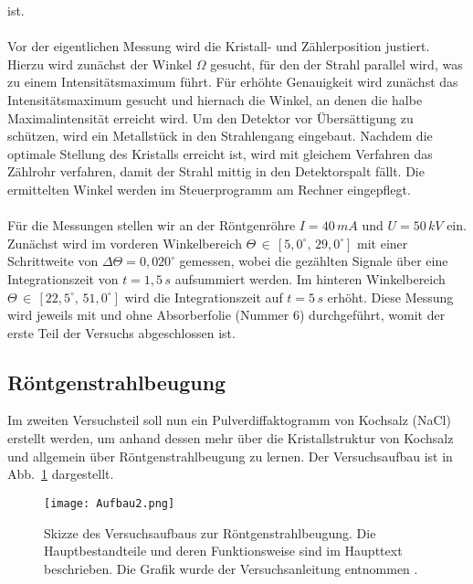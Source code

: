 ist. \\ \\
Vor der eigentlichen Messung wird die Kristall- und Zählerposition justiert. 
Hierzu wird zunächst der Winkel $\Omega$ gesucht, für den der Strahl parallel
wird, was zu einem Intensitätsmaximum führt. Für erhöhte Genauigkeit wird
zunächst das Intensitätsmaximum gesucht und hiernach die Winkel, an denen die halbe 
Maximalintensität erreicht wird. Um den Detektor vor Übersättigung zu schützen, 
wird ein Metallstück in den Strahlengang eingebaut. Nachdem die optimale Stellung 
des Kristalls erreicht ist, wird mit gleichem Verfahren das Zählrohr verfahren, 
damit der Strahl mittig in den Detektorspalt fällt. Die ermittelten Winkel werden
im Steuerprogramm am Rechner eingepflegt. \\ \\
Für die Messungen stellen wir an der Röntgenröhre $I = 40\,\si{mA}$ und 
$U = 50\,\si{kV}$ ein. Zunächst wird im vorderen Winkelbereich 
$\Theta\,\in\,[5,0^{\circ},\,29,0^{\circ}]$ mit einer Schrittweite von 
$\Delta{\Theta} = 0,020^{\circ}$ gemessen, wobei die gezählten Signale 
über eine Integrationszeit von $t=1,5\,\si{s}$ aufsummiert werden. 
Im hinteren Winkelbereich $\Theta\,\in\,[22,5^{\circ},\,51,0^{\circ}]$
wird die Integrationszeit auf $t=5\,\si{s}$ erhöht. 
Diese Messung wird jeweils mit und ohne Absorberfolie (Nummer 6) durchgeführt, 
womit der erste Teil der Versuchs abgeschlossen ist. \\

\subsection{\label{subsec:vers2}Röntgenstrahlbeugung}
Im zweiten Versuchsteil soll nun ein Pulverdiffaktogramm von Kochsalz (NaCl) erstellt werden, um anhand dessen mehr über die Kristallstruktur von Kochsalz und allgemein über Röntgenstrahlbeugung zu lernen. Der Versuchsaufbau ist in Abb.~\ref{fig:vers2} dargestellt.

\begin{figure}[h!]
    \centering
    \texttt{[image: Aufbau2.png]}
    \caption{Skizze des Versuchsaufbaus zur Röntgenstrahlbeugung. Die Hauptbestandteile und deren 
    Funktionsweise sind im Haupttext beschrieben. Die Grafik wurde der Versuchsanleitung entnommen \cite{Anleitung}.}
    \label{fig:vers2}
\end{figure}\FloatBarrier

